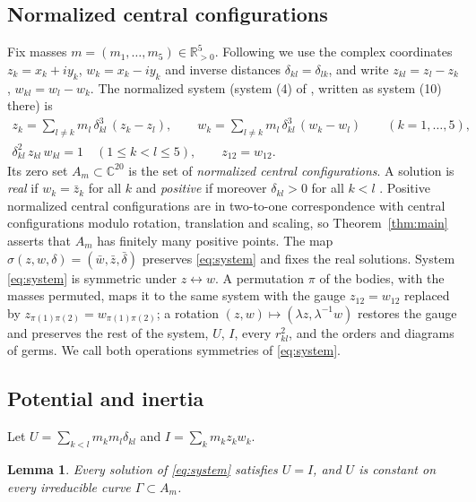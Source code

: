 \documentclass[11pt]{amsart}
\newtheorem{lemma}[theorem]{Lemma}
\theoremstyle{definition}
\theoremstyle{remark}
\newcommand{\C}{\mathbb{C}}
\newcommand{\Rp}{\mathbb{R}_{>0}}
\begin{document}
\subsection{Normalized central configurations}
Fix masses $m=(m_1,\dots,m_5)\in\Rp^5$.  Following \cite[\S2]{AK} we use the complex coordinates
$z_k=x_k+iy_k$, $w_k=x_k-iy_k$ and inverse distances $\delta_{kl}=\delta_{lk}$, and write
$z_{kl}=z_l-z_k$, $w_{kl}=w_l-w_k$.  The normalized system (system (4) of \cite{AK}, written as
system (10) there) is
\begin{equation}\label{eq:system}
\begin{gathered}
  z_k = \sum_{l\ne k} m_l\,\delta_{kl}^3\,(z_k-z_l),\qquad
  w_k = \sum_{l\ne k} m_l\,\delta_{kl}^3\,(w_k-w_l)\qquad (k=1,\dots,5),\\
  \delta_{kl}^2\, z_{kl}\,w_{kl} = 1\quad (1\le k<l\le 5),\qquad z_{12} = w_{12}.
\end{gathered}
\end{equation}
Its zero set $A_m\subset\C^{20}$ is the set of \emph{normalized central configurations}.  A
solution is \emph{real} if $w_k=\bar z_k$ for all $k$ and \emph{positive} if moreover
$\delta_{kl}>0$ for all $k<l$ \cite[Def.~2]{AK}.  Positive normalized central configurations are
in two-to-one correspondence with central configurations modulo rotation, translation and
scaling, so Theorem~\ref{thm:main} asserts that $A_m$ has finitely many positive points.
The map $\sigma(z,w,\delta)=(\bar w,\bar z,\bar\delta)$ preserves \eqref{eq:system} and fixes
the real solutions.  System \eqref{eq:system} is symmetric under $z\leftrightarrow w$.  A
permutation $\pi$ of the bodies, with the masses permuted, maps it to the same system with the
gauge $z_{12}=w_{12}$ replaced by $z_{\pi(1)\pi(2)}=w_{\pi(1)\pi(2)}$; a rotation
$(z,w)\mapsto(\lambda z,\lambda^{-1}w)$ restores the gauge and preserves the rest of the system,
$U$, $I$, every $r_{kl}^2$, and the orders and diagrams of germs.  We call both operations
symmetries of \eqref{eq:system}.

\subsection{Potential and inertia}
Let $U=\sum_{k<l}m_km_l\delta_{kl}$ and $I=\sum_k m_kz_kw_k$.

\begin{lemma}\label{lem:U-constant}
Every solution of \eqref{eq:system} satisfies $U=I$, and $U$ is constant on every irreducible
curve $\Gamma\subset A_m$.
\end{lemma}
\end{document}

